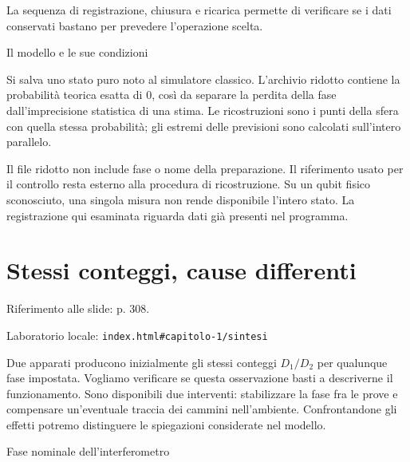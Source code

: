 La sequenza di registrazione, chiusura e ricarica permette di verificare se i dati conservati bastano per prevedere l'operazione scelta.\par


Il modello e le sue condizioni\par

Si salva uno stato puro noto al simulatore classico. L'archivio ridotto contiene la probabilità teorica esatta di 0, così da separare la perdita della fase dall'imprecisione statistica di una stima. Le ricostruzioni sono i punti della sfera con quella stessa probabilità; gli estremi delle previsioni sono calcolati sull'intero parallelo.\par

Il file ridotto non include fase o nome della preparazione. Il riferimento usato per il controllo resta esterno alla procedura di ricostruzione. Su un qubit fisico sconosciuto, una singola misura non rende disponibile l'intero stato. La registrazione qui esaminata riguarda dati già presenti nel programma.\par



\Needspace{.43\textheight}
\section{Stessi conteggi, cause differenti}
\label{c1-sintesi}

{\sffamily\small\color{Ink!70} Riferimento alle slide: p. 308.\par}

{\sffamily\small\color{Ink!70} Laboratorio locale: \nolinkurl{index.html#capitolo-1/sintesi}\par}

Due apparati producono inizialmente gli stessi conteggi \(D_{1}/D_{2}\) per qualunque fase impostata. Vogliamo verificare se questa osservazione basti a descriverne il funzionamento. Sono disponibili due interventi: stabilizzare la fase fra le prove e compensare un'eventuale traccia dei cammini nell'ambiente. Confrontandone gli effetti potremo distinguere le spiegazioni considerate nel modello.\par



Fase nominale dell'interferometro\par

